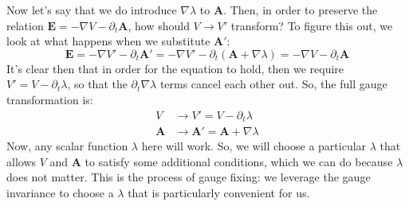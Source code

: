 Now let's say that we do introduce \( \nabla \lambda \) to \( \mathbf{A} \). Then, in order to preserve the
relation \( \mathbf{E} = -\nabla V - \partial_t \mathbf{A} \), how should \( V \to V' \) transform? To figure this
out, we look at what happens when we substitute \( \mathbf{A}' \):
\[
	\mathbf{E} = -\nabla V' - \partial_t \mathbf{A}' = -\nabla V' - \partial_t (\mathbf{A} + \nabla \lambda)
	= -\nabla V - \partial_t \mathbf{A}
\]
It's clear then that in order for the equation to hold, then we require \( V' = V - \partial_t \lambda \), so
that the \( \partial_t \nabla \lambda \) terms cancel each other out. So, the full gauge transformation is:
\begin{align*}
	V & \to V' = V - \partial_t \lambda\\
	\mathbf{A} & \to \mathbf{A}' = \mathbf{A} + \nabla \lambda
\end{align*}
Now, any scalar function \( \lambda \) here will work. So, we will choose a particular \( \lambda \) that
allows \( V \) and \( \mathbf{A} \) to satisfy some additional conditions, which we can do because \( \lambda
\) does not matter. This is the process of gauge fixing: we leverage the gauge invariance to choose a \(
\lambda \) that is particularly convenient for us. 

